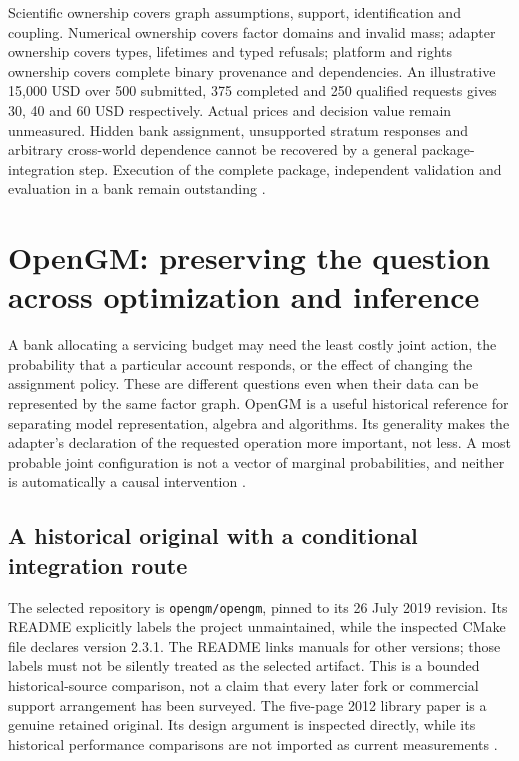 Scientific ownership covers graph assumptions, support, identification and
coupling. Numerical ownership covers factor domains and invalid mass;
adapter ownership covers types, lifetimes and typed refusals; platform and
rights ownership covers complete binary provenance and dependencies.
An illustrative 15,000 USD over 500 submitted, 375 completed and 250
qualified requests gives 30, 40 and 60 USD respectively. Actual prices and
decision value remain unmeasured. Hidden bank assignment, unsupported
stratum responses and arbitrary cross-world dependence cannot be recovered
by a general package-integration step. Execution of the complete package, independent validation and evaluation in a bank remain outstanding \cite{exec24_agrum_choice}.


\section{OpenGM: preserving the question across optimization and inference}
\label{sec:exec24-opengm-reuse}

A bank allocating a servicing budget may need the least costly joint action,
the probability that a particular account responds, or the effect of changing
the assignment policy. These are different questions even when their data
can be represented by the same factor graph. OpenGM is a useful historical
reference for separating model representation, algebra and algorithms. Its
generality makes the adapter's declaration of the requested operation more
important, not less. A most probable joint configuration is not a vector of
marginal probabilities, and neither is automatically a causal intervention
\cite{exec24_opengm_paper,exec24_opengm_source,exec24_opengm_choice}.

\subsection{A historical original with a conditional integration route}
The selected repository is \texttt{opengm/opengm}, pinned to its 26 July
2019 revision. Its README explicitly labels the project unmaintained, while
the inspected CMake file declares version 2.3.1. The README links manuals
for other versions; those labels must not be silently treated as the
selected artifact. This is a bounded historical-source comparison, not a
claim that every later fork or commercial support arrangement has been
surveyed. The five-page 2012 library paper is a genuine retained original.
Its design argument is inspected directly, while its historical performance
comparisons are not imported as current measurements
\cite{exec24_opengm_paper,exec24_opengm_source}.

